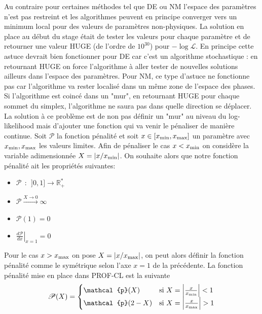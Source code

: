 \documentclass[a4paper,11pt]{article}
\numberwithin{equation}{section}
\begin{document}
Au contraire pour certaines méthodes tel que DE ou NM l'espace des paramètres n'est pas restreint et les algorithmes peuvent en principe converger vers un minimum local pour des valeurs de paramètres non-physiques.\newline
	La solution en place au début du stage était de tester les valeurs pour chaque paramètre et de retourner une valeur HUGE (de l'ordre de $10^30$) pour $-\log \mathscr{L}$. En principe cette astuce devrait bien fonctionner pour DE car c'est un algorithme stochastique : en retournant HUGE on force l'algorithme à aller tester de nouvelles solutions ailleurs dans l'espace des paramètres. \newline 
	Pour NM, ce type d'astuce ne fonctionne pas car l'algorithme va rester localisé dans un même zone de l'espace des phases. Si l'algorithme est coincé dans un "mur", en retournant HUGE pour chaque sommet du simplex, l'algorithme ne saura pas dans quelle direction se déplacer. \newline
  La solution à ce problème est de non pas définir un "mur" au niveau du log-likelihood mais d'ajouter une fonction qui va venir le pénaliser de manière continue. Soit $\mathscr{P}$ la fonction pénalité et soit $x \in [x_{\rm{min}} , x_{\rm{max}}]$ un paramètre avec $x_{\rm{min}} ,x_{\rm{max}}$ les valeurs limites. Afin de pénaliser le cas $x < x_{\rm{min}}$ on considère la variable adimensionnée $X = | x/x_{\rm{min}} |$. On souhaite alors que notre fonction pénalité ait les propriétés suivantes:
  \begin{itemize}
    \item $\mathscr{P} \ \ : \ \ ]0,1] \rightarrow \mathbb{R}_+^*$
    \item $\mathscr{P} \xrightarrow{X \rightarrow 0} \infty$
    \item $\mathscr{P} (1) = 0$
    \item $\left. \frac{d\mathscr{P}}{dx} \right | _{x=1} = 0$
  \end{itemize}

  Pour le cas $x > x_{\rm{max}}$ on pose $X = | x/x_{\rm{max}} |$, on peut alors définir la fonction pénalité comme le symétrique selon l'axe $x=1$ de la précédente. \newline
  La fonction pénalité mise en place dans PROF-CL est la suivante
  \begin{equation}
    \mathscr{P}(X) = 
    \begin{cases}    %
      \mathcal{p} (X) & \mbox{si } X = \left | \frac{x}{x_{\rm{min}}} \right | < 1 \\
      \mathcal{p} (2-X) & \mbox{si } X = \left | \frac{x}{x_{\rm{max}}} \right | > 1
    \end{cases}
  \end{equation}
  
\end{document}
